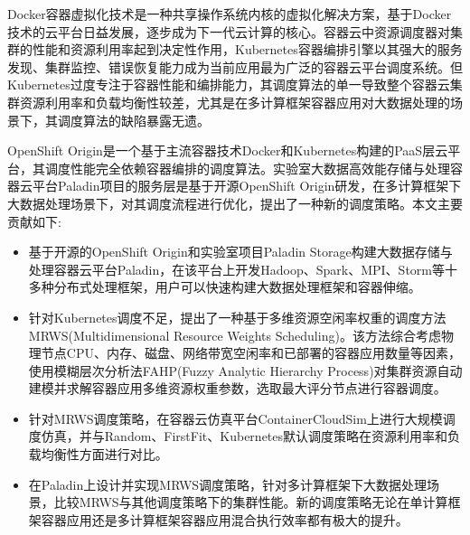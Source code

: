 \begin{cabstract}
  Docker容器虚拟化技术是一种共享操作系统内核的虚拟化解决方案，基于Docker技术的云平台日益发展，逐步成为下一代云计算的核心。容器云中资源调度器对集群的性能和资源利用率起到决定性作用，Kubernetes容器编排引擎以其强大的服务发现、集群监控、错误恢复能力成为当前应用最为广泛的容器云平台调度系统。但Kubernetes过度专注于容器性能和编排能力，其调度算法的单一导致整个容器云集群资源利用率和负载均衡性较差，尤其是在多计算框架容器应用对大数据处理的场景下，其调度算法的缺陷暴露无遗。

OpenShift Origin是一个基于主流容器技术Docker和Kubernetes构建的PaaS层云平台，其调度性能完全依赖容器编排的调度算法。实验室大数据高效能存储与处理容器云平台Paladin项目的服务层是基于开源OpenShift Origin研发，在多计算框架下大数据处理场景下，对其调度流程进行优化，提出了一种新的调度策略。本文主要贡献如下:
  \begin{itemize}
  \item 基于开源的OpenShift Origin和实验室项目Paladin Storage构建大数据存储与处理容器云平台Paladin，在该平台上开发Hadoop、Spark、MPI、Storm等十多种分布式处理框架，用户可以快速构建大数据处理框架和容器伸缩。
  \item 针对Kubernetes调度不足，提出了一种基于多维资源空闲率权重的调度方法MRWS(Multidimensional Resource Weights Scheduling)。该方法综合考虑物理节点CPU、内存、磁盘、网络带宽空闲率和已部署的容器应用数量等因素，使用模糊层次分析法FAHP(Fuzzy Analytic Hierarchy Process)对集群资源自动建模并求解容器应用多维资源权重参数，选取最大评分节点进行容器调度。
  \item 针对MRWS调度策略，在容器云仿真平台ContainerCloudSim上进行大规模调度仿真，并与Random、FirstFit、Kubernetes默认调度策略在资源利用率和负载均衡性方面进行对比。
  \item 在Paladin上设计并实现MRWS调度策略，针对多计算框架下大数据处理场景，比较MRWS与其他调度策略下的集群性能。新的调度策略无论在单计算框架容器应用还是多计算框架容器应用混合执行效率都有极大的提升。
  \end{itemize}
\end{cabstract}


